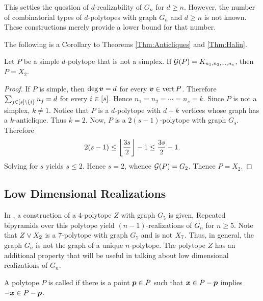             This settles the question of \(d\)-realizability of \(G_n\) for \(d\ge n\).  However, the number of combinatorial types of \(d\)-polytopes with graph \(G_n\) and \(d\ge n\) is not known.  These constructions merely provide a lower bound for that number.


            The following is a Corollary to Theorems \ref{Thm:Anticliques} and \ref{Thm:Halin}.
                \begin{Cor}
                    Let \(P\) be a simple \(d\)-polytope that is not a simplex. If \(\mathcal{G}(P)=K_{n_1,n_2,\dotsc, n_s}\), then \(P=X_2\).
                \end{Cor}
                \begin{proof}
                    If \(P\) is simple, then \(\deg\bm{v}=d\) for every \(\bm{v}\in\operatorname{vert} P\).  Therefore \(\sum_{j\in\left[s\right]\setminus\left\{i\right\}}n_j=d\) for every \(i\in\left[s\right]\).  Hence \(n_1=n_2=\dotsb=n_s=k\).  Since \(P\) is not a simplex, \(k\ne1\).  Notice that \(P\) is  a \(d\)-polytope with \(d+k\) vertices whose graph has a \(k\)-anticlique.  Thus \(k=2\).  Now, \(P\) is a \(2(s-1)\)-polytope with graph \(G_s\).  Therefore
                        \[
                            2(s-1)\le\left\lfloor\frac{3s}2\right\rfloor-1\le\frac{3s}2-1.
                        \]
                    Solving for \(s\) yields \(s\le2\).  Hence \(s=2\), whence \(\mathcal{G}(P)=G_2\).  Thence \(P=X_2\).
                \end{proof}

        \subsection{Low Dimensional Realizations}

            In \cite{GrunBook}, a construction of a \(4\)-polytope \(Z\) with graph \(G_5\) is given.  Repeated bipyramids over this polytope yield \((n-1)\)-realizations of \(G_n\) for \(n\ge 5\).  Note that \(Z\vee X_{2}\) is a \(7\)-polytope with graph \(G_7\) and is not \(X_{7}\).  Thus, in general, the graph \(G_n\) is not the graph of a unique \(n\)-polytope.  The polytope \(Z\) has an additional property that will be useful in talking about low dimensional realizations of \(G_n\).

            \begin{Definition}
                A polytope \(P\) is called  if there is a point \(\bm{p}\in P\) such that \(\bm{x}\in P-\bm{p}\) implies \(-\bm{x}\in P-\bm{p}\).
            \end{Definition}

